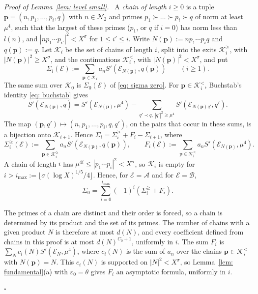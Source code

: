 \documentclass{article}
\numberwithin{equation}{section}
\newenvironment{proof}[1][Proof]{\par\medskip\noindent\textit{#1.}\ }{\hfill$\square$\par\medskip}
\newcommand{\Le}{\leqslant}
\newcommand{\Ge}{\geqslant}
\begin{document}
\begin{proof}[Proof of Lemma~\ref{lem: level small}]
A \emph{chain of length} $i \Ge 0$ is a tuple $\boldsymbol{p} = (n, p_1, \dots, p_i, q)$ with $n \in \mathcal{N}_2$ and primes $p_1 \succ \dots \succ p_i \succ q$ of norm at least $\mu^4$, such that the largest of these primes ($p_1$, or $q$ if $i = 0$) has norm less than $l(n)$, and $|n p_1 \cdots p_{i'}|^2 < X^{\sigma}$ for $1 \Le i' \Le i$. Write $N(\boldsymbol{p}) := n p_1 \cdots p_i q$ and $q(\boldsymbol{p}) := q$. Let $\mathcal{K}_i$ be the set of chains of length $i$, split into the exits $\mathcal{K}^{\Ge}_i$, with $|N(\boldsymbol{p})|^2 \Ge X^{\sigma}$, and the continuations $\mathcal{K}^{<}_i$, with $|N(\boldsymbol{p})|^2 < X^{\sigma}$, and put
\begin{equation*}
\Sigma_i(\mathcal{E}) := \sum_{\boldsymbol{p} \in \mathcal{K}_i} a_n S'(\mathcal{E}_{N(\boldsymbol{p})}, q(\boldsymbol{p})) \qquad (i \Ge 1).
\end{equation*}
The same sum over $\mathcal{K}_0$ is $\Sigma_0(\mathcal{E})$ of \eqref{eq: sigma zero}. For $\boldsymbol{p} \in \mathcal{K}^{<}_i$, Buchstab's identity \eqref{eq: buchstab} gives
\begin{equation*}
S'(\mathcal{E}_{N(\boldsymbol{p})}, q) = S'(\mathcal{E}_{N(\boldsymbol{p})}, \mu^4) - \sum_{q' \prec q,\ |q'|^2 \Ge \mu^4} S'(\mathcal{E}_{N(\boldsymbol{p}) q'}, q').
\end{equation*}
The map $(\boldsymbol{p}, q') \mapsto (n, p_1, \dots, p_i, q, q')$, on the pairs that occur in these sums, is a bijection onto $\mathcal{K}_{i+1}$. Hence $\Sigma_i = \Sigma^{\Ge}_i + F_i - \Sigma_{i+1}$, where
\begin{equation*}
\Sigma^{\Ge}_i(\mathcal{E}) := \sum_{\boldsymbol{p} \in \mathcal{K}^{\Ge}_i} a_n S'(\mathcal{E}_{N(\boldsymbol{p})}, q(\boldsymbol{p})), \qquad F_i(\mathcal{E}) := \sum_{\boldsymbol{p} \in \mathcal{K}^{<}_i} a_n S'(\mathcal{E}_{N(\boldsymbol{p})}, \mu^4).
\end{equation*}
A chain of length $i$ has $\mu^{4i} \Le |p_1 \cdots p_i|^2 < X^{\sigma}$, so $\mathcal{K}_i$ is empty for $i > i_{\max} := \lfloor \sigma (\log X)^{1/5}/4 \rfloor$. Hence, for $\mathcal{E} = \mathcal{A}$ and for $\mathcal{E} = \mathcal{B}$,
\begin{equation}
\label{eq: chain sum}
\Sigma_0 = \sum_{i=0}^{i_{\max}} (-1)^i (\Sigma^{\Ge}_i + F_i).
\end{equation}

The primes of a chain are distinct and their order is forced, so a chain is determined by its product and the set of its primes. The number of chains with a given product $N$ is therefore at most $d(N)$, and every coefficient defined from chains in this proof is at most $d(N)^{C_0 + 1}$, uniformly in $i$. The sum $F_i$ is $\sum_N c_i(N) S'(\mathcal{E}_N, \mu^4)$, where $c_i(N)$ is the sum of $a_n$ over the chains $\boldsymbol{p} \in \mathcal{K}^{<}_i$ with $N(\boldsymbol{p}) = N$. This $c_i(N)$ is supported on $|N|^2 < X^{\sigma}$, so Lemma~\ref{lem: fundamental}(a) with $\varepsilon_0 = \theta$ gives $F_i$ an asymptotic formula, uniformly in $i$.


\end{proof}
\end{document}
